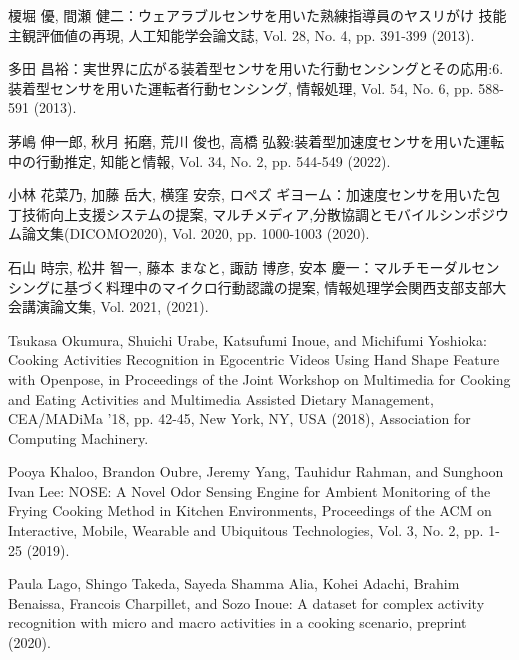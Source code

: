 \begin{thebibliography}{参考文献}
	榎堀 優, 間瀬 健二：ウェアラブルセンサを用いた熟練指導員のヤスリがけ
	技能主観評価値の再現, 人工知能学会論文誌, Vol. 28, No. 4, pp. 391-399 (2013).
	
	多田 昌裕：実世界に広がる装着型センサを用いた行動センシングとその応用:6. 装着型センサを用いた運転者行動センシング, 情報処理, Vol. 54, No. 6, pp. 588-591 (2013).

	茅嶋 伸一郎, 秋月 拓磨, 荒川 俊也, 高橋 弘毅:装着型加速度センサを用いた運転中の行動推定, 知能と情報, Vol. 34, No. 2, pp. 544-549 (2022).


	小林 花菜乃, 加藤 岳大, 横窪 安奈, ロペズ ギヨーム：加速度センサを用いた包丁技術向上支援システムの提案, マルチメディア,分散協調とモバイルシンポジウム論文集(DICOMO2020), Vol. 2020, pp. 1000-1003 (2020).
	
	石山 時宗, 松井 智一, 藤本 まなと, 諏訪 博彦, 安本 慶一：マルチモーダルセンシングに基づく料理中のマイクロ行動認識の提案, 情報処理学会関西支部支部大会講演論文集, Vol. 2021, (2021).

	Tsukasa Okumura, Shuichi Urabe, Katsufumi Inoue, and Michifumi Yoshioka: Cooking Activities Recognition in Egocentric Videos Using Hand Shape Feature with Openpose, in Proceedings of the Joint Workshop on Multimedia for Cooking and Eating Activities and Multimedia Assisted Dietary Management, CEA/MADiMa '18, pp. 42-45, New York, NY, USA (2018), Association for Computing Machinery.

	Pooya Khaloo, Brandon Oubre, Jeremy Yang, Tauhidur Rahman, and Sunghoon Ivan Lee: NOSE: A Novel Odor Sensing Engine for Ambient Monitoring of the Frying Cooking Method in Kitchen Environments, Proceedings of the ACM on Interactive, Mobile, Wearable and Ubiquitous Technologies, Vol. 3, No. 2, pp. 1-25 (2019).

	Paula Lago, Shingo Takeda, Sayeda Shamma Alia, Kohei Adachi, Brahim Benaissa, Francois Charpillet, and Sozo Inoue: A dataset for complex activity recognition with micro and macro activities in a cooking scenario, preprint (2020).


\end{thebibliography}
